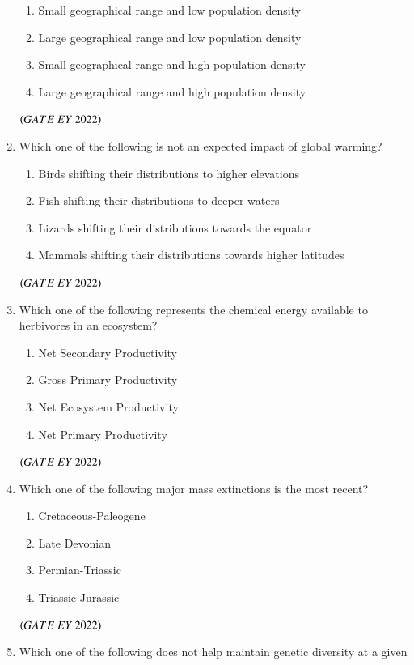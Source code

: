 \documentclass[journal]{IEEEtran}
\numberwithin{equation}{enumi}
\numberwithin{figure}{enumi}
\begin{document}
\begin{enumerate}
    \begin{enumerate}
        \item  Small geographical range and low population density
        \item  Large geographical range and low population density
        \item  Small geographical range and high population density
        \item  Large geographical range and high population density
    \end{enumerate}
    \hfill{$\brak{ GATE\ EY\ 2022}$}
    \bigskip
 \item Which one of the following is not an expected impact of global warming?
    \begin{enumerate}
        \item  Birds shifting their distributions to higher elevations
        \item  Fish shifting their distributions to deeper waters
        \item  Lizards shifting their distributions towards the equator
        \item  Mammals shifting their distributions towards higher latitudes
    \end{enumerate}
    \hfill{$\brak{ GATE\ EY\ 2022}$}
    \bigskip
 \item Which one of the following represents the chemical energy available to herbivores
in an ecosystem?
    \begin{enumerate}
        \item  Net Secondary Productivity
        \item  Gross Primary Productivity
        \item  Net Ecosystem Productivity
        \item  Net Primary Productivity
    \end{enumerate}
    \hfill{$\brak{ GATE\ EY\ 2022}$}
    \bigskip
 \item Which one of the following major mass extinctions is the most recent?
    \begin{enumerate}
        \item  Cretaceous-Paleogene
        \item  Late Devonian
        \item  Permian-Triassic
        \item  Triassic-Jurassic
    \end{enumerate}
    \hfill{$\brak{ GATE\ EY\ 2022}$}
    \bigskip
 \item Which one of the following does not help maintain genetic diversity at a given

\end{enumerate}
\end{document}
